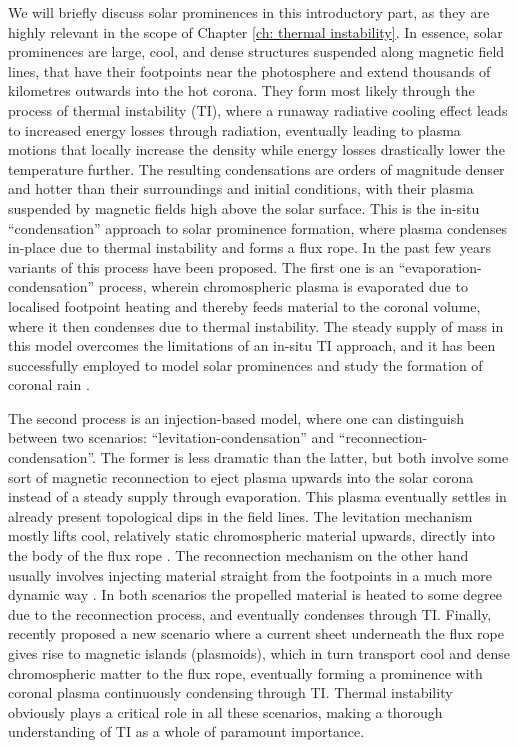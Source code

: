 We will briefly discuss solar prominences in this introductory part, as they are highly relevant in the scope of Chapter \ref{ch: thermal instability}. In essence, solar prominences are large, cool, and dense structures suspended along magnetic field lines, that have their footpoints near the photosphere and extend thousands of kilometres outwards into the hot corona. They form most likely through the process of thermal instability (TI), where a runaway radiative cooling effect leads to increased energy losses through radiation, eventually leading to plasma motions that locally increase the density while energy losses drastically lower the temperature further. The resulting condensations are orders of magnitude denser and hotter than their surroundings and initial conditions, with their plasma suspended by magnetic fields high above the solar surface. This is the in-situ ``condensation'' approach to solar prominence formation, where plasma condenses in-place due to thermal instability and forms a flux rope. In the past few years variants of this process have been proposed.
The first one is an ``evaporation-condensation'' process, wherein chromospheric plasma is evaporated due to localised footpoint heating and thereby feeds material to the coronal volume, where it then condenses due to thermal instability. The steady supply of mass in this model overcomes the limitations of an in-situ TI approach, and it has been successfully employed to model solar prominences \citep{xia2016} and study the formation of coronal rain \citep{fang2013,moschou2015,xia2017}.

The second process is an injection-based model, where one can distinguish between two scenarios: ``levitation-condensation'' and ``reconnection-condensation''. The former is less dramatic than the latter, but both involve some sort of magnetic reconnection to eject plasma upwards into the solar corona instead of a steady supply through evaporation. This plasma eventually settles in already present topological dips in the field lines. The levitation mechanism mostly lifts cool, relatively static chromospheric material upwards, directly into the body of the flux rope \citep{kaneko2015,zhao2017,jenkins2021}. The reconnection mechanism on the other hand usually involves injecting material straight from the footpoints in a much more dynamic way \citep{kaneko2017}. In both scenarios the propelled material is heated to some degree due to the reconnection process, and eventually condenses through TI.
Finally, \citet{zhao2022} recently proposed a new scenario where a current sheet underneath the flux rope gives rise to magnetic islands (plasmoids), which in turn transport cool and dense chromospheric matter to the flux rope, eventually forming a prominence with coronal plasma continuously condensing through TI. Thermal instability obviously plays a critical role in all these scenarios, making a thorough understanding of TI as a whole of paramount importance.

